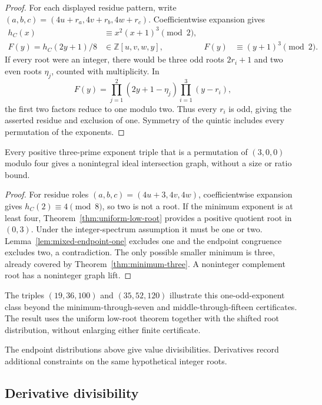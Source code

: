 \begin{proof}
For each displayed residue pattern, write
$(a,b,c)=(4u+r_a,4v+r_b,4w+r_c)$. Coefficientwise expansion gives
\begin{align*}
 h_C(x)&\equiv x^2(x+1)^3\pmod2,\\
 F(y)=h_C(2y+1)/8&\in\mathbb Z[u,v,w,y], &
 F(y)&\equiv(y+1)^3\pmod2.
\end{align*}
If every root were an integer, there would be three odd roots $2r_i+1$
and two even roots $\eta_j$, counted with multiplicity. In
\[
 F(y)=\prod_{j=1}^2(2y+1-\eta_j)\prod_{i=1}^3(y-r_i),
\]
the first two factors reduce to one modulo two. Thus every $r_i$ is
odd, giving the asserted residue and exclusion of one. Symmetry of the
quintic includes every permutation of the exponents.
\end{proof}

\begin{proposition}
\label{thm:one-odd-endpoints}
Every positive three-prime exponent triple that is a permutation of
$(3,0,0)$ modulo four gives a nonintegral ideal intersection graph,
without a size or ratio bound.
\end{proposition}

\begin{proof}
For residue roles $(a,b,c)=(4u+3,4v,4w)$, coefficientwise expansion
gives $h_C(2)\equiv4\pmod8$, so two is not a root.
If the minimum exponent is at least four, Theorem~\ref{thm:uniform-low-root}
provides a positive quotient root in $(0,3)$. Under the integer-spectrum
assumption it must be one or two. Lemma~\ref{lem:mixed-endpoint-one}
excludes one and the endpoint congruence excludes two, a contradiction.
The only possible smaller minimum is three, already covered by
Theorem~\ref{thm:minimum-three}. A noninteger complement root has a
noninteger graph lift.
\end{proof}

The triples $(19,36,100)$ and $(35,52,120)$ illustrate this one-odd-exponent
class beyond the minimum-through-seven and middle-through-fifteen
certificates. The result uses the uniform low-root theorem together with
the shifted root distribution, without enlarging either finite certificate.

The endpoint distributions above give value divisibilities. Derivatives
record additional constraints on the same hypothetical integer roots.

\subsection{Derivative divisibility}

